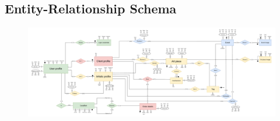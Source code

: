 \subsection{Entity-Relationship Schema}

\begin{figure}[h]
    \centering
    \includegraphics[width=1\linewidth]{images/ERschema.pdf}
\end{figure}



